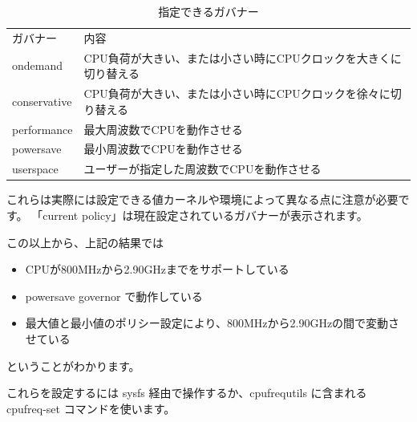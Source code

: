 \documentclass[mingoth,a4paper]{jsarticle}
\begin{document}
\begin{table}[htb]
\begin{center}
\begin{tabular}{l|l}
ガバナー & 内容 \\
ondemand &	CPU負荷が大きい、または小さい時にCPUクロックを大きくに切り替える \\
conservative &	CPU負荷が大きい、または小さい時にCPUクロックを徐々に切り替える \\
performance &	最大周波数でCPUを動作させる \\
powersave &	最小周波数でCPUを動作させる \\
userspace &	ユーザーが指定した周波数でCPUを動作させる \\
\end{tabular}
\caption{指定できるガバナー}
\label{tab:governors}
\end{center}
\end{table}

これらは実際には設定できる値カーネルや環境によって異なる点に注意が必要です。
「current policy」は現在設定されているガバナーが表示されます。

この以上から、上記の結果では

\begin{itemize}
\item CPUが800MHzから2.90GHzまでをサポートしている
\item powersave governor で動作している
\item 最大値と最小値のポリシー設定により、800MHzから2.90GHzの間で変動させている
\end{itemize}

ということがわかります。

これらを設定するには sysfs 経由で操作するか、cpufrequtils に含まれる
cpufreq-set コマンドを使います。
\end{document}
